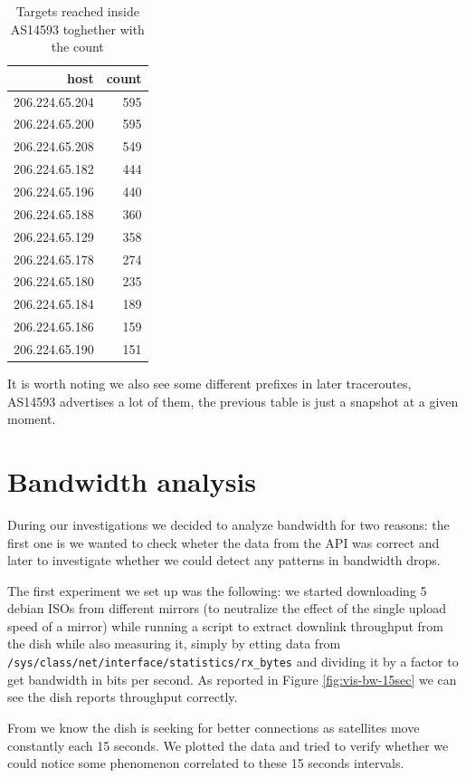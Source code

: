 \documentclass[IN,11pt,twoside,openright,bachelor,english]{tumthesis}
\begin{document}
\begin{table}[]
	\centering
	\begin{tabular}{ r r }
		\toprule
		host           & count \\ 
		\midrule
		206.224.65.204 & 595   \\
		206.224.65.200 & 595   \\
		206.224.65.208 & 549   \\ 
		206.224.65.182 & 444   \\
		206.224.65.196 & 440   \\ 
		206.224.65.188 & 360   \\ 
		206.224.65.129 & 358   \\ 
		206.224.65.178 & 274   \\ 
		206.224.65.180 & 235   \\ 
		206.224.65.184 & 189   \\ 
		206.224.65.186 & 159   \\ 
		206.224.65.190 & 151   \\
		\bottomrule
	\end{tabular}
	\caption{Targets reached inside AS14593 toghether with the count}
	\end{table}

It is worth noting we also see some different prefixes in later traceroutes, AS14593 advertises a lot of them, the previous table is just a snapshot at a given moment.

\section{Bandwidth analysis}
\label{sec:bw}
During our investigations we decided to analyze bandwidth for two reasons: the first one is we wanted to check wheter the data from the API was correct and later to investigate whether we could detect any patterns in bandwidth drops.

The first experiment we set up was the following: we started downloading 5 debian ISOs from different mirrors (to neutralize the effect of the single upload speed of a mirror) while running a script to extract downlink throughput from the dish while also measuring it, simply by etting data from \texttt{/sys/class/net/{interface}/statistics/rx\_bytes} and dividing it by a factor to get bandwidth in bits per second. As reported in Figure \ref{fig:vis-bw-15sec} we can see the dish reports throughput correctly.

From \cite{llc-application} we know the dish is seeking for better connections as satellites move constantly each 15 seconds. We plotted the data and tried to verify whether we could notice some phenomenon correlated to these 15 seconds intervals.
\end{document}
